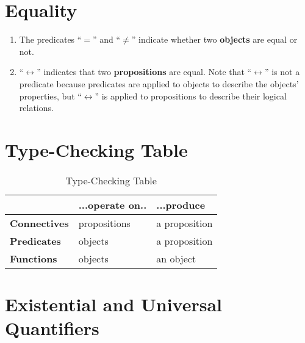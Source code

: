 \documentclass[12pt, letterpaper, oneside]{book}
\begin{document}
\section{Equality}

\begin{enumerate}
  \item The predicates ``$=$'' and ``$\neq$'' indicate whether two
        \textbf{objects} are equal or not.
  \item ``$\leftrightarrow $'' indicates that two \textbf{propositions} are
        equal. Note that ``$\leftrightarrow $'' is not a predicate because
        predicates are applied to objects to describe the objects' properties, but
        ``$\leftrightarrow $'' is applied to propositions to describe their logical
        relations.
\end{enumerate}

\section{Type-Checking Table}

\begin{table}[H]
  \centering
  \begin{tabular}{|l|l|l|}
    \hline
    \textbf{}            & \textbf{...operate on..} & \textbf{...produce} \\ [1ex] \hline
    \textbf{Connectives} & propositions             & a proposition       \\ [1ex] \hline
    \textbf{Predicates}  & objects                  & a proposition       \\ [1ex] \hline
    \textbf{Functions}   & objects                  & an object           \\ [1ex] \hline
  \end{tabular}
  \caption{Type-Checking Table}
  \label{FOL_type_checking_table}
\end{table}

\section{Existential and Universal Quantifiers}
\end{document}
